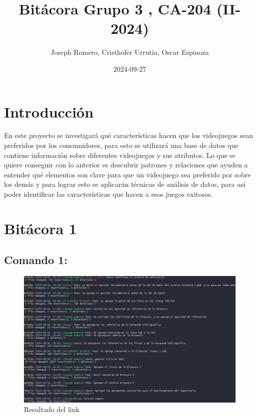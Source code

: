 \documentclass[
  letterpaper,
  DIV=11,
  numbers=noendperiod]{scrreprt}
\title{Bitácora Grupo 3 , CA-204 (II-2024)}
\author{Joseph Romero, Cristhofer Urrutia, Oscar Espinoza}
\date{2024-09-27}
\renewcommand*\contentsname{Tabla de contenidos}
\newcommand\contentsname{Tabla de contenidos}
\begin{document}
\maketitle

\renewcommand*\contentsname{Tabla de contenidos}
{
\hypersetup{linkcolor=}
\setcounter{tocdepth}{2}
\tableofcontents
}

\chapter*{Introducción}\label{introducciuxf3n}


En este proyecto se investigará qué características hacen que los
videojuegos sean preferidos por los consumidores, para esto se utilizará
una base de datos que contiene información sobre diferentes videojuegos
y sus atributos. Lo que se quiere conseguir con lo anterior es descubrir
patrones y relaciones que ayuden a entender qué elementos son clave para
que un videojuego sea preferido por sobre los demás y para lograr esto
se aplicarán técnicas de análisis de datos, para así poder identificar
las características que hacen a esos juegos exitosos.


\chapter{Bitácora 1}\label{bituxe1cora-1}

\section{Comando 1:}\label{comando-1}

\begin{figure}[H]

{\centering \includegraphics{imagenes/link-1.png}

}

\caption{Resultado del link}

\end{figure}%
\end{document}
